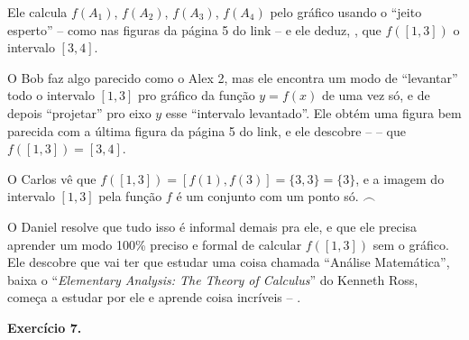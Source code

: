 \documentclass[oneside,12pt]{article}
\begin{document}
{{Ele calcula $f(A_1)$, $f(A_2)$, $f(A_3)$, $f(A_4)$ pelo gráfico usando
o ``jeito esperto'' -- como nas figuras da página 5 do link -- e ele
deduz, , que
$f([1,3])$  o intervalo $[3,4]$.

\msk

O Bob faz algo parecido como o Alex 2, mas ele encontra um modo de
``levantar'' todo o intervalo $[1,3]$ pro gráfico da função $y=f(x)$
de uma vez só, e de depois ``projetar'' pro eixo $y$ esse ``intervalo
levantado''. Ele obtém uma figura bem parecida com a última figura da
página 5 do link, e ele descobre --  -- que $f([1,3]) = [3,4]$.

\msk

O Carlos vê que 
$f([1,3]) = [f(1),f(3)] = \{3,3\} = \{3\}$, e  a
imagem do intervalo $[1,3]$ pela função $f$ é um conjunto com um ponto
só. $\frown$

\msk

O Daniel resolve que tudo isso é informal demais pra ele, e que ele
precisa aprender um modo 100\% preciso e formal de calcular $f([1,3])$
sem o gráfico. Ele descobre que vai ter que estudar uma coisa chamada
``Análise Matemática'', baixa o ``{\sl Elementary Analysis: The Theory
  of Calculus}'' do Kenneth Ross, começa a estudar por ele e aprende
coisa incríveis -- .

\msk


}}

\newpage


{\bf Exercício 7.}
\end{document}
